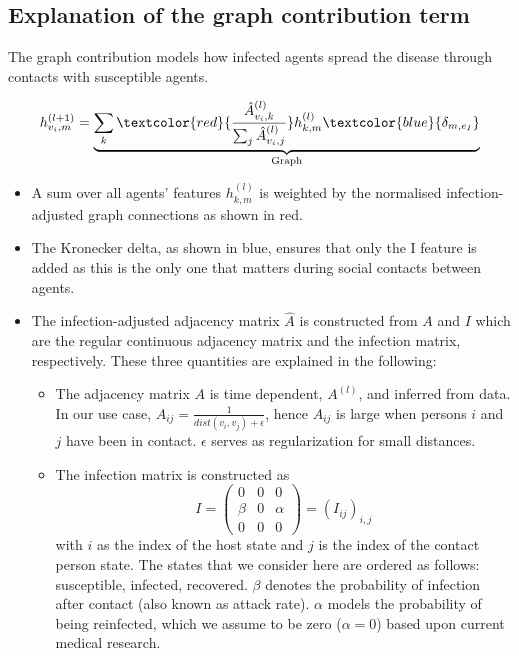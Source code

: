 \subsection{Explanation of the graph contribution term}
The graph contribution models how infected agents spread the disease through contacts with susceptible agents.

\begin{equation}
h_{v_i, m}^{(l+1)}
=
\underbrace{
	\sum_k \textcolor{red}{\frac{\hat{A}_{v_i, k}^{(l)}}{\sum_j \hat{A}_{v_i, j}^{(l)}}} h_{k, m}^{(l)} \textcolor{blue}{\delta_{m, e_I}}
}_{\text{Graph}}
\end{equation}

\begin{itemize}
	\item A sum over all agents' features $h_{k,m}^{(l)}$ is weighted by the normalised infection-adjusted graph connections as shown in red.
	\item The Kronecker delta, as shown in blue, ensures that only the I feature is added as this is the only one that matters during social contacts between agents.
	\item The infection-adjusted adjacency matrix $\hat{A}$ is constructed from $A$ and $I$ which are the regular continuous adjacency matrix and the infection matrix, respectively. These three quantities are explained in the following:
	\begin{itemize}
		\item The adjacency matrix $A$ is time dependent, $A^{(l)}$, and inferred from data. In our use case, $A_{ij} = \frac{1}{dist(v_i, v_j)+\epsilon}$, hence $A_{ij}$ is large when persons $i$ and $j$ have been in contact. $\epsilon$ serves as regularization for small distances.
		\item The infection matrix is constructed as
		\begin{equation}
		I =
		\begin{pmatrix}
		0     &  0  & 0 \\
		\beta &  0  & \alpha \\
		0     &  0  & 0
		\end{pmatrix}
		=
		(I_{ij})_{i,j}
		\end{equation}
		with $i$ as the index of the host state and $j$ is the index of the contact person state. The states that we consider here are ordered as follows: susceptible, infected, recovered. $\beta$ denotes the probability of infection  after contact (also known as attack rate). $\alpha$ models the probability of being reinfected, which we assume to be zero ($\alpha=0$) based upon current medical research.

\end{itemize}
\end{itemize}
